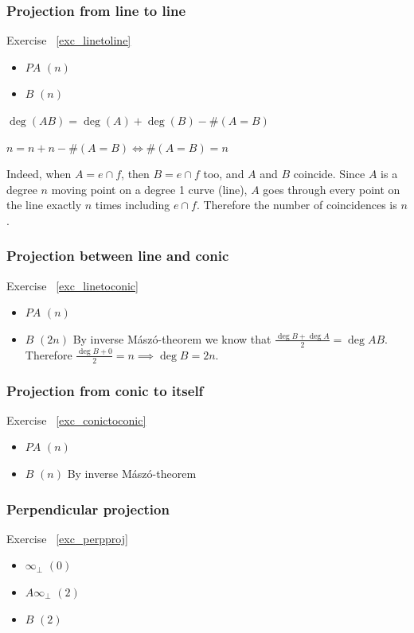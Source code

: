 \documentclass[a4paper]{article}
\begin{document}
\vspace{0.5cm}
\begin{minipage}{0.5\textwidth}
\subsubsection{Projection from line to line}
Exercise ~\ref{exc_linetoline}
\label{sol_linetoline}
\begin{itemize}
    \item $PA$ $(n)$
    \item $B$ $(n)$
\end{itemize}
$\deg (AB)= \deg (A) + \deg (B) - \# (A=B)$

$n=n+n-\# (A=B) \iff \# (A=B)=n$

Indeed, when $A=e\cap f$, then $B=e\cap f$ too, and $A$ and $B$ coincide. Since $A$ is a degree $n$ moving point on a degree 1 curve (line), $A$ goes through every point on the line exactly $n$ times including $e\cap f$. Therefore the number of coincidences is $n$.
\end{minipage}
\begin{minipage}{0.5\textwidth}
\subsubsection{Projection between line and conic}
Exercise ~\ref{exc_linetoconic}
\label{sol_linetoconic}
\begin{itemize}
    \item $PA$ $(n)$
    \item $B$ $(2n)$ By inverse Mászó-theorem we know that $\frac{\deg B+\deg A}{2}=\deg AB$. Therefore $\frac{\deg B+0}{2}=n\implies \deg B=2n$.
\end{itemize}
\end{minipage}

\vspace{1cm}
\begin{minipage}{0.5\textwidth}
\subsubsection{Projection from conic to itself} Exercise ~\ref{exc_conictoconic}
\label{sol_conictoconic}
\begin{itemize}
    \item $PA$ $(n)$
    \item $B$ $(n)$ By inverse Mászó-theorem
\end{itemize}
\end{minipage}
\begin{minipage}{0.5\textwidth}
\subsubsection{Perpendicular projection} Exercise ~\ref{exc_perpproj}
\label{sol_perpproj}
\begin{itemize}
    \item $\infty_{\perp}$ $(0)$
    \item $A\infty_{\perp}$ $(2)$
    \item $B$ $(2)$
\end{itemize}
\end{minipage}
\end{document}
